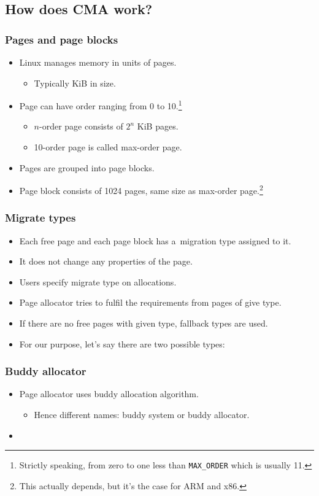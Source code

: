 \subsection{How does CMA work?}

\begin{frame}[fragile]
  \frametitle{Pages and page blocks}

  \begin{itemize}
  \item Linux manages memory in units of pages.
    \begin{itemize}
    \item Typically \unit[4]{KiB} in size.
    \end{itemize}
  \item Page can have order ranging from 0 to 10.\footnote{Strictly
    speaking, from zero to one less than \lstinline|MAX_ORDER| which is
    usually 11.}
    \begin{itemize}
    \item $n$-order page consists of $2^n$ \unit[4]{KiB} pages.
    \item 10-order page is called max-order page.
    \end{itemize}
  \item Pages are grouped into page blocks.
  \item Page block consists of 1024 pages, same size as max-order
    page.\footnote{This actually depends, but it's the case for ARM
      and x86.}
  \end{itemize}
\end{frame}

\begin{frame}[fragile]
  \frametitle{Migrate types}

  \begin{itemize}
  \item Each free page and each page block has a~migration type
    assigned to it.
  \item It does not change any properties of the page.
  \item Users specify migrate type on allocations.
  \item Page allocator tries to fulfil the requirements from pages of
    give type.
  \item If there are no free pages with given type, fallback types are
    used.
  \item For our purpose, let's say there are two possible types:
  \end{itemize}
\end{frame}

\begin{frame}
  \frametitle{Buddy allocator}

  \begin{itemize}
  \item Page allocator uses buddy allocation algorithm.
    \begin{itemize}
    \item Hence different names: buddy system or buddy allocator.
    \end{itemize}
  \item
  \end{itemize}
\end{frame}
